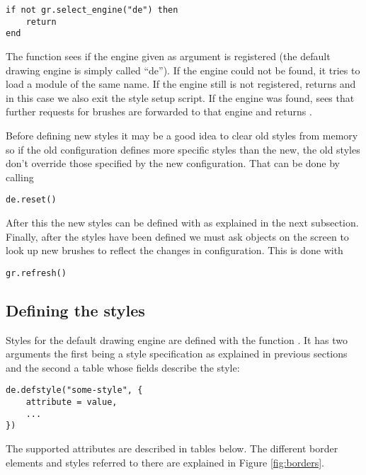 \begin{verbatim}
if not gr.select_engine("de") then 
    return 
end
\end{verbatim}

The  function sees if the engine
given as argument is registered (the default drawing engine is
simply called ``de''). If the engine could not be found, it
tries to load a module of the same name. If the engine still
is not registered,  returns 
and in this case we also exit the style setup script.
If the engine was found,  sees that
further requests for brushes are forwarded to that engine
and returns .

Before defining new styles it may be a good idea to clear old
styles from memory so if the old configuration defines more
specific styles than the new, the old styles don't override 
those specified by the new configuration. That can be done by
calling

\begin{verbatim}
de.reset()
\end{verbatim}

After this the new styles can be defined with 
as explained in the next subsection. Finally, after the styles have
been defined we must ask objects on the screen to look up new brushes
to reflect the changes in configuration. This is done with

\begin{verbatim}
gr.refresh()
\end{verbatim}

\subsection{Defining the styles}

Styles for the default drawing engine are defined with the
function . It has two arguments the first being
a style specification as explained in previous sections and the second
a table whose fields describe the style:

\begin{verbatim}
de.defstyle("some-style", {
    attribute = value,
    ...
})
\end{verbatim}

The supported attributes are described in tables below. The different
border elements and styles referred to there are explained in Figure
\ref{fig:borders}.

